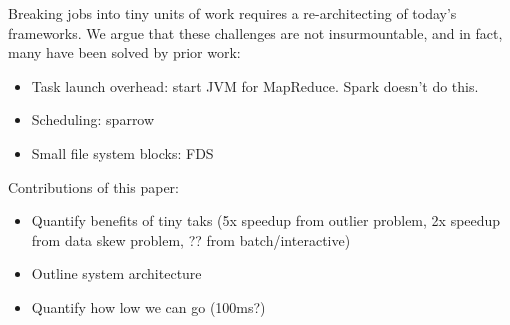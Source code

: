 Breaking jobs into tiny units of work requires a re-architecting of today's frameworks.  We argue that these challenges are not insurmountable, and in fact, many
have been solved by prior work:
\begin{itemize}
\item Task launch overhead: start JVM for MapReduce. Spark doesn't do this.
\item Scheduling: sparrow
\item Small file system blocks: FDS
\end{itemize}

Contributions of this paper:
\begin{itemize}
\item Quantify benefits of tiny taks (5x speedup from outlier problem, 2x speedup
from data skew problem, ?? from batch/interactive)
\item Outline system architecture
\item Quantify how low we can go (100ms?)
\end{itemize}

\begin{comment}
Today's datacenters run increasingly diverse workloads. A decade ago, compute
clusters were designed for batch workloads: a typical job took hours to complete.
As users migrated large amounts of data to these clusters, they demanded ever
faster access to this data, spurring low-latency frameworks (e.g., Dremel, Spark,
Shark, Impala) that stripe work across thousands of machines or store data in
memory in order to complete jobs in seconds. While data analysts and user-facing
services rely on these low-latency frameworks, clusters continue to run
long-running, batch jobs (e.g., indexing the web), leading to a diverse mix of
job runtimes.  Workload studies from Facebook, Microsoft, Yahoo!, and Google
corroborate this claim, finding that job completion times range from seconds to days.
\end{comment}
